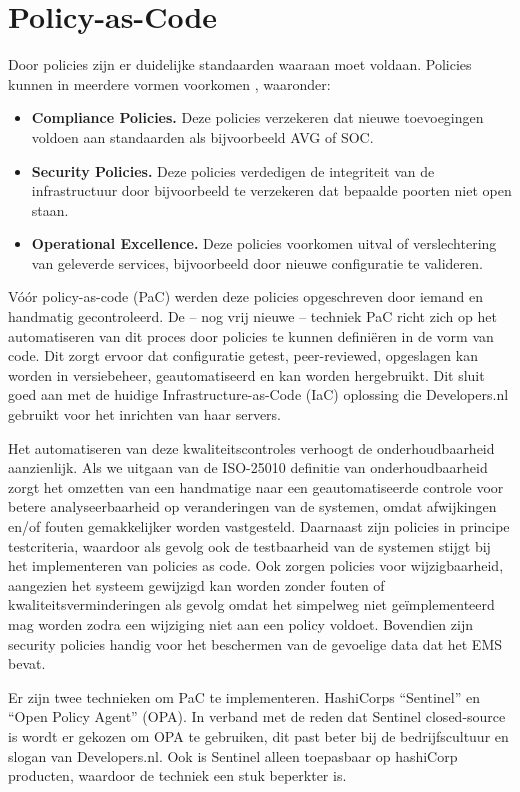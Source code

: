 \section{Policy-as-Code}
Door policies zijn er duidelijke standaarden waaraan moet voldaan. Policies kunnen in meerdere vormen voorkomen \parencite{WhyPaC}, waaronder:
\begin{itemize}
	\item \textbf{Compliance Policies.} Deze policies verzekeren dat nieuwe toevoegingen voldoen aan standaarden als bijvoorbeeld AVG of SOC.
	\item \textbf{Security Policies.} Deze policies verdedigen de integriteit van de infrastructuur door bijvoorbeeld te verzekeren dat bepaalde poorten niet open staan.
	\item \textbf{Operational Excellence.} Deze policies voorkomen uitval of verslechtering van geleverde services, bijvoorbeeld door nieuwe configuratie te valideren.
\end{itemize}

Vóór policy-as-code (PaC) werden deze policies opgeschreven door iemand en handmatig gecontroleerd. De -- nog vrij nieuwe -- techniek PaC richt zich op het automatiseren van dit proces door policies te kunnen definiëren in de vorm van code. Dit zorgt ervoor dat configuratie getest, peer-reviewed, opgeslagen kan worden in versiebeheer, geautomatiseerd en kan worden hergebruikt. Dit sluit goed aan met de huidige Infrastructure-as-Code (IaC) oplossing die Developers.nl gebruikt voor het inrichten van haar servers.

Het automatiseren van deze kwaliteitscontroles verhoogt de onderhoudbaarheid aanzienlijk. Als we uitgaan van de ISO-25010 definitie van onderhoudbaarheid \parencite{ISO25010} zorgt het omzetten van een handmatige naar een geautomatiseerde controle voor betere analyseerbaarheid op veranderingen van de systemen, omdat afwijkingen en/of fouten gemakkelijker worden vastgesteld. Daarnaast zijn policies in principe testcriteria, waardoor als gevolg ook de testbaarheid van de systemen stijgt bij het implementeren van policies as code. Ook zorgen policies voor wijzigbaarheid, aangezien het systeem gewijzigd kan worden zonder fouten of kwaliteitsverminderingen als gevolg omdat het simpelweg niet geïmplementeerd mag worden zodra een wijziging niet aan een policy voldoet. Bovendien zijn security policies handig voor het beschermen van de gevoelige data dat het EMS bevat.

Er zijn twee technieken om PaC te implementeren. HashiCorps \enquote{Sentinel} en \enquote{Open Policy Agent} (OPA). In verband met de reden dat Sentinel closed-source is wordt er gekozen om OPA te gebruiken, dit past beter bij de bedrijfscultuur en slogan van Developers.nl. Ook is Sentinel alleen toepasbaar op hashiCorp producten, waardoor de techniek een stuk beperkter is.

